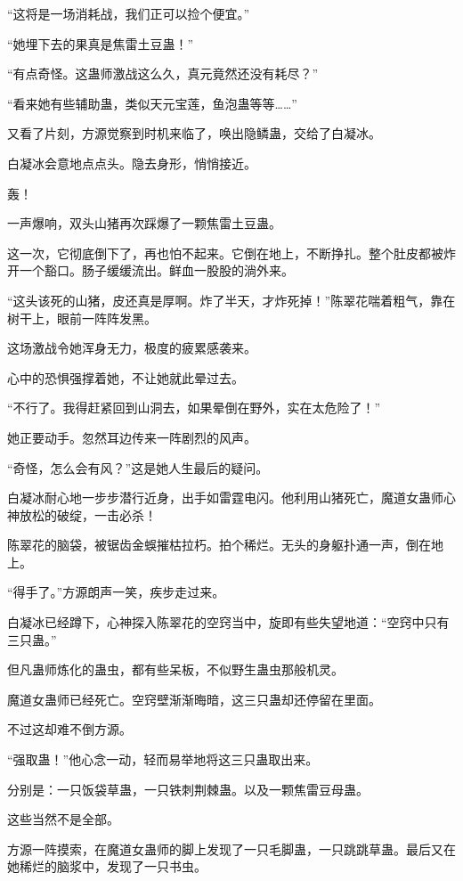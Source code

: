 \begin{this_body}
“这将是一场消耗战，我们正可以捡个便宜。”

“她埋下去的果真是焦雷土豆蛊！”

“有点奇怪。这蛊师激战这么久，真元竟然还没有耗尽？”

“看来她有些辅助蛊，类似天元宝莲，鱼泡蛊等等……”

又看了片刻，方源觉察到时机来临了，唤出隐鳞蛊，交给了白凝冰。

白凝冰会意地点点头。隐去身形，悄悄接近。

轰！

一声爆响，双头山猪再次踩爆了一颗焦雷土豆蛊。

这一次，它彻底倒下了，再也怕不起来。它倒在地上，不断挣扎。整个肚皮都被炸开一个豁口。肠子缓缓流出。鲜血一股股的淌外来。

“这头该死的山猪，皮还真是厚啊。炸了半天，才炸死掉！”陈翠花喘着粗气，靠在树干上，眼前一阵阵发黑。

这场激战令她浑身无力，极度的疲累感袭来。

心中的恐惧强撑着她，不让她就此晕过去。

“不行了。我得赶紧回到山洞去，如果晕倒在野外，实在太危险了！”

她正要动手。忽然耳边传来一阵剧烈的风声。

“奇怪，怎么会有风？”这是她人生最后的疑问。

白凝冰耐心地一步步潜行近身，出手如雷霆电闪。他利用山猪死亡，魔道女蛊师心神放松的破绽，一击必杀！

陈翠花的脑袋，被锯齿金蜈摧枯拉朽。拍个稀烂。无头的身躯扑通一声，倒在地上。

“得手了。”方源朗声一笑，疾步走过来。

白凝冰已经蹲下，心神探入陈翠花的空窍当中，旋即有些失望地道：“空窍中只有三只蛊。”

但凡蛊师炼化的蛊虫，都有些呆板，不似野生蛊虫那般机灵。

魔道女蛊师已经死亡。空窍壁渐渐晦暗，这三只蛊却还停留在里面。

不过这却难不倒方源。

“强取蛊！”他心念一动，轻而易举地将这三只蛊取出来。

分别是：一只饭袋草蛊，一只铁刺荆棘蛊。以及一颗焦雷豆母蛊。

这些当然不是全部。

方源一阵摸索，在魔道女蛊师的脚上发现了一只毛脚蛊，一只跳跳草蛊。最后又在她稀烂的脑浆中，发现了一只书虫。


\end{this_body}
